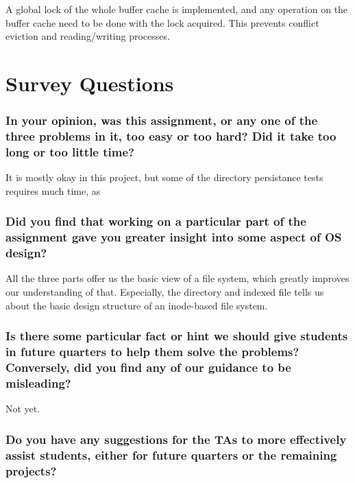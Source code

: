 \documentclass[sigconf, nonacm, balance=false, urlbreakonhyphens=true]{acmart}
\begin{document}
                A global lock of the whole buffer cache is implemented, and any operation on the buffer cache need to be done with the lock acquired. This prevents conflict eviction and reading/writing processes. 

    \section{Survey Questions}


        \subsubsection*{In your opinion, was this assignment, or any one of the three problems in it, too easy or too hard? Did it take too long or too little time? }

            It is mostly okay in this project, but some of the directory persistance tests requires much time, as 

        \subsubsection*{Did you find that working on a particular part of the assignment gave you greater insight into some aspect of OS design? }

            All the three parts offer us the basic view of a file system, which greatly improves our understanding of that. Especially, the directory and indexed file tells us about the basic design structure of an inode-based file system. 

        \subsubsection*{Is there some particular fact or hint we should give students in future quarters to help them solve the problems? Conversely, did you find any of our guidance to be misleading? }

            Not yet. 

        \subsubsection*{Do you have any suggestions for the TAs to more effectively assist students, either for future quarters or the remaining projects? }
\end{document}
